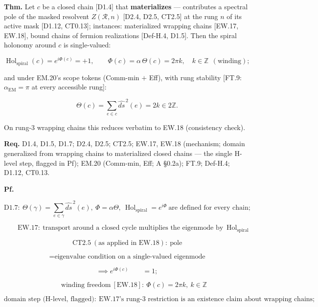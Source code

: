 \begin{theorem}\label{tag:FT-22}
\textbf{Thm.} Let $c$ be a closed chain [D1.4] that \textbf{materializes} — contributes a spectral pole of the masked resolvent $Z(\mathcal R,n)$ [D2.4, D2.5, CT2.5] at the rung $n$ of its active mask [D1.12, CT0.13]; instances: materialized wrapping chains [EW.17, EW.18], bound chains of fermion realizations [Def-H.4, D1.5]. Then the spiral holonomy around $c$ is single-valued:

\[
\operatorname{Hol}_{\mathrm{spiral}}(c)=e^{i\Phi(c)}=+1,\qquad\Phi(c)=\alpha\,\Theta(c)=2\pi k,\quad k\in\mathbb Z\ \ (\text{winding});
\]

and under EM.20's scope tokens (Comm-min $+$ Eff), with rung stability [FT.9: $\alpha_{\mathrm{EM}}=\pi$ at every accessible rung]:

\[
\Theta(c)=\sum_{e\in c}\widehat{ds}^{\,2}(e)=2k\in2\mathbb Z .
\]

On rung-3 wrapping chains this reduces verbatim to EW.18 (consistency check).

\textbf{Req.} D1.4, D1.5, D1.7; D2.4, D2.5; CT2.5; EW.17, EW.18 (mechanism; domain generalized from wrapping chains to materialized closed chains — the single H-level step, flagged in Pf); EM.20 (Comm-min, Eff; A §0.2a); FT.9; Def-H.4; D1.12, CT0.13.

\textbf{Pf.}

\[
\mathrm{D1.7}:\ \Theta(\gamma)=\textstyle\sum_{e\in\gamma}\widehat{ds}^{\,2}(e),\ \Phi=\alpha\Theta,\ \operatorname{Hol}_{\mathrm{spiral}}=e^{i\Phi}\ \text{are defined for every chain};
\]

\[
\qquad \mathrm{EW.17}:\ \text{transport around a closed cycle multiplies the eigenmode by}\ \operatorname{Hol}_{\mathrm{spiral}}
\]

\[
\mathrm{CT2.5}\ (\text{as applied in EW.18}):\ \text{pole}
\]

\[
= \text{eigenvalue condition on a single-valued eigenmode}
\]

\[
\implies e^{i\Phi(c)}\qquad = 1;
\]

\[
\qquad \text{winding freedom}\ [\mathrm{EW.18}]:\ \Phi(c)=2\pi k,\ k\in\mathbb Z
\]

\[
\text{domain step (H-level, flagged)}:\ \mathrm{EW.17}\text{'s rung-3 restriction is an existence claim about wrapping chains};
\]


\end{theorem}
